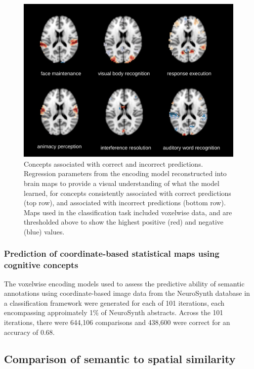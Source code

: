 \documentclass{report}
\begin{document}
\begin{figure}[ht!]
\begin{center}
\includegraphics[width=15cm]{images/figure32.png}
\end{center}
 \caption{\label{fig:32} Concepts associated with correct and incorrect predictions.
Regression parameters from the encoding model reconstructed into brain
maps to provide a visual understanding of what the model learned, for
concepts consistently associated with correct predictions (top row), and
associated with incorrect predictions (bottom row). Maps used in the
classification task included voxelwise data, and are thresholded above
to show the highest positive (red) and negative (blue) values.}
\end{figure}

\subsubsection{Prediction of coordinate-based statistical maps using cognitive concepts}
The voxelwise encoding models used to assess the predictive ability of
semantic annotations using coordinate-based image data from the NeuroSynth database in a classification framework were generated for each of 101 iterations, each encompassing approimately 1\% of NeuroSynth abstracts. Across the 101 iterations, there were 644,106 comparisons and 438,600 were correct for an accuracy of 0.68.


\subsection{Comparison of semantic to spatial similarity}
\end{document}
